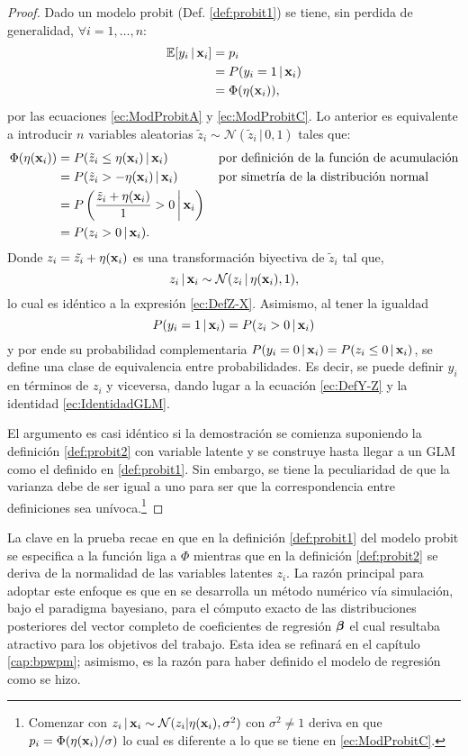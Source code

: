 \documentclass[../Main/Main.tex]{subfiles}
\begin{document}
\begin{proof} Dado un modelo probit (Def. \ref{def:probit1}) se tiene, sin perdida de generalidad, $\forall i = 1,\ldots,n$:
\begin{align*}
	\mathbb{E}[y_i\,|\,\mathbf{x}_i] &= p_i  \\
				&= P(y_i = 1\,|\,\mathbf{x}_i) \\
				&= \Phi(\eta(\mathbf{x}_i)),
\end{align*}
por las ecuaciones \eqref{ec:ModProbitA} y \eqref{ec:ModProbitC}. Lo anterior es equivalente a introducir $n$ variables aleatorias $\tilde{z}_i \sim \mathcal{N}(\tilde{z}_i\,|\,0,1)$ tales que:
\begin{align*}
	\Phi(\eta(\mathbf{x}_i)) 	&= P(\tilde{z}_i \leq \eta(\mathbf{x}_i)\,|\,\mathbf{x}_i)
					\qquad\qquad \text{por definición de la función de acumulación}\\
			      	&= P(\tilde{z}_i > - \eta(\mathbf{x}_i)\,|\,\mathbf{x}_i) \qquad\:\quad \text{por simetría de la distribución normal}\\
			      	&= P\left(\dfrac{\tilde{z}_i + \eta(\mathbf{x}_i)}{1} > 0\,\bigg|\,\mathbf{x}_i\right)\\
			      	&= P(z_i > 0\,|\,\mathbf{x}_i).
\end{align*}
Donde $z_i = \tilde{z_i} + \eta(\mathbf{x}_i)$ es una transformación biyectiva de $\tilde{z}_i$ tal que,
$$z_i\,|\,\mathbf{x}_i \sim \mathcal{N}(z_i\,|\,\eta(\mathbf{x}_i),1),$$ 
lo cual es idéntico a la expresión \eqref{ec:DefZ-X}. Asimismo, al tener la igualdad $$P(y_i = 1\,|\,\mathbf{x}_i) = P(z_i > 0\,|\,\mathbf{x}_i)$$ y por ende su probabilidad complementaria $P(y_i = 0\,|\,\mathbf{x}_i) = P(z_i \leq 0\,|\,\mathbf{x}_i)$, se define una clase de equivalencia entre probabilidades. Es decir, se puede definir $y_i$ en términos de $z_i$ y viceversa, dando lugar a la ecuación \eqref{ec:DefY-Z} y la identidad \eqref{ec:IdentidadGLM}. 

El argumento es casi idéntico si la demostración se comienza suponiendo la definición \ref{def:probit2} con variable latente y se construye hasta llegar a un GLM como el definido en \ref{def:probit1}. Sin embargo, se tiene la peculiaridad de que la varianza debe de ser igual a uno para ser que la correspondencia entre definiciones sea unívoca.\footnote{Comenzar con $z_i\,|\,\mathbf{x}_i \sim \mathcal{N}(z_i|\eta(\mathbf{x}_i),\sigma^2)$ con $\sigma^2\neq 1$ deriva en que $p_i = \Phi(\eta(\mathbf{x}_i)/\sigma)$ lo cual es diferente a lo que se tiene en \eqref{ec:ModProbitC}.}
\end{proof}

La clave en la prueba recae en que en la definición \ref{def:probit1} del modelo probit se especifica a la función liga a $\Phi$ mientras que en la definición \ref{def:probit2} se deriva de la normalidad de las variables latentes $z_i$. La razón principal para adoptar este enfoque es que en \citet{albert1993bayesian} se desarrolla un método numérico vía simulación, bajo el paradigma bayesiano, para el cómputo exacto de las distribuciones posteriores del vector completo de coeficientes de regresión $\bm{\beta}$ el cual resultaba atractivo para los objetivos del trabajo. Esta idea se refinará en el capítulo \ref{cap:bpwpm}; asimismo, es la razón para haber definido el modelo de regresión como se hizo.
\end{document}
